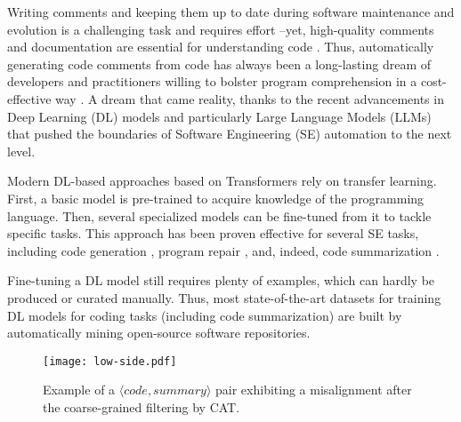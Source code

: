 Writing comments and keeping them up to date during software maintenance and evolution is a challenging task and requires effort \cite{fluri2007code,fluri2009analyzing,linares2015developers,wen2019large}--yet, 
high-quality comments and documentation are essential for understanding code \cite{rani2023decade,de2005study}. Thus, automatically generating code comments from code has always been a long-lasting dream of developers and practitioners willing to bolster program comprehension in a cost-effective way \cite{haque2020improved,hu2020deep,leclair2019neural,zhang2020retrieval,mastropaolo2021studying,gao2023code}. A dream that came reality, thanks to the recent advancements in Deep Learning (DL) models and particularly Large Language Models (LLMs) that pushed the boundaries of Software Engineering (SE) automation to the next level.

Modern DL-based approaches based on Transformers \cite{vaswani2017attention,devlin2018bert,raffel2020exploring} rely on transfer learning. First, a basic model is pre-trained to acquire knowledge of the programming language. Then, several specialized models can be fine-tuned from it to tackle specific tasks.
This approach has been proven effective for several SE tasks, including code generation \cite{wei2019code,svyatkovskiy2020intellicode,liu2024your,ugare2024improving}, program repair \cite{jin2023inferfix,chen2022neural,chen2019sequencer,tufano2018empirical}, and, indeed, code summarization \cite{hu2018summarizing,hu2018deep,zhang2020retrieval,gao2023code,leclair2020improved,mastropaolo2021studying}.

Fine-tuning a DL model still requires plenty of examples, which can hardly be produced or curated manually. Thus, most state-of-the-art datasets for training DL models for coding tasks (including code summarization) are built by automatically mining open-source software repositories. 

\begin{figure}[t]
	\centering
	\texttt{[image: low-side.pdf]}
	\caption{Example of a $\langle code, summary \rangle$ pair exhibiting a misalignment after the coarse-grained filtering by CAT.}
	\label{fig:intro-example}
\end{figure}

